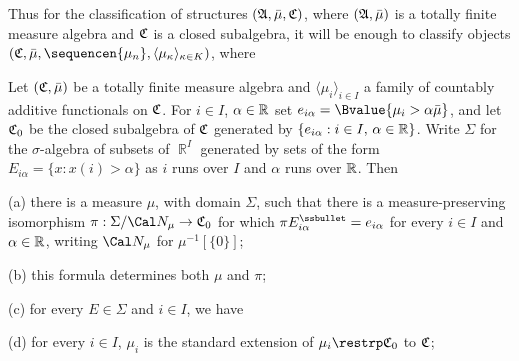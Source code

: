  Thus for the classification of structures
$(\frak A,\bar\mu,\frak C)$, where $(\frak A,\bar\mu)$ is a totally finite
measure algebra and $\frak C$ is a closed subalgebra, it will be enough
to classify objects $(\frak C,\bar\mu,\sequencen{\mu_n},
\langle\mu_{\kappa}\rangle_{\kappa\in K})$, where







 Let $(\frak C,\bar\mu)$ be a
totally finite measure
algebra and $\langle\mu_i\rangle_{i\in I}$ a family of countably
additive functionals on $\frak C$.   For $i\in I$, $\alpha\in\Bbb R$
set $e_{i\alpha}=\Bvalue{\mu_i>\alpha\bar\mu}$, and
let $\frak C_0$ be the closed subalgebra of $\frak C$
generated by $\{e_{i\alpha}:i\in I,\,\alpha\in\Bbb R\}$.   Write
$\Sigma$ for the
$\sigma$-algebra of subsets of $\BbbR^I$ generated by sets of the form
$E_{i\alpha}=\{x:x(i)>\alpha\}$ as $i$ runs over $I$ and $\alpha$ runs
over $\Bbb R$.   Then

(a) there is a measure $\mu$, with domain $\Sigma$, such that there
is a measure-preserving isomorphism
$\pi:\Sigma/\Cal N_{\mu}\to\frak C_0$ for which
$\pi E_{i\alpha}^{\ssbullet}=e_{i\alpha}$ for every $i\in I$ and
$\alpha\in\Bbb R$, writing $\Cal N_{\mu}$ for $\mu^{-1}[\{0\}]$;

(b) this formula determines both $\mu$ and $\pi$;

(c) for every $E\in\Sigma$ and $i\in I$, we have


(d) for every $i\in I$, $\mu_i$ is the standard extension of
$\mu_i\restrp\frak C_0$ to $\frak C$;

